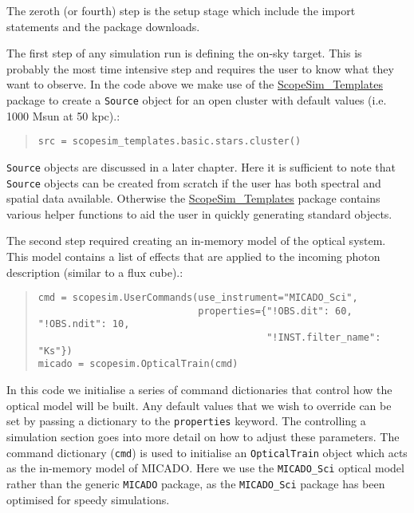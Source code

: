 The zeroth (or fourth) step is the setup stage which include the import statements and the package downloads.

The first step of any simulation run is defining the on-sky target.
This is probably the most time intensive step and requires the user to know what they want to observe.
In the code above we make use of the \href{https://scopesim-templates.readthedocs.io/en/latest/}{ScopeSim\_Templates} package to create a \texttt{Source} object for an open cluster with default values (i.e. 1000 Msun at 50 kpc).:

\begin{quote}
\begin{alltt}
\begin{lstlisting}[frame=single]
src = scopesim_templates.basic.stars.cluster()
\end{lstlisting}
\end{alltt}
\end{quote}

\texttt{Source} objects are discussed in a later chapter.
Here it is sufficient to note that \texttt{Source} objects can be created from scratch if the user has both spectral and spatial data available.
Otherwise the \href{https://scopesim-templates.readthedocs.io/en/latest/}{ScopeSim\_Templates} package contains various helper functions to aid the user in quickly generating \textquotedbl{}standard\textquotedbl{} objects.

The second step required creating an in-memory model of the optical system.
This model contains a list of effects that are applied to the incoming photon description (similar to a flux cube).:

\begin{quote}
\begin{alltt}
\begin{lstlisting}[frame=single]
cmd = scopesim.UserCommands(use_instrument="MICADO_Sci",
                            properties={"!OBS.dit": 60, "!OBS.ndit": 10,
                                        "!INST.filter_name": "Ks"})
micado = scopesim.OpticalTrain(cmd)
\end{lstlisting}
\end{alltt}
\end{quote}

In this code we initialise a series of command dictionaries that control how the optical model will be built.
Any default values that we wish to override can be set by passing a dictionary to the \texttt{properties} keyword.
The \textquotedbl{}controlling a simulation\textquotedbl{} section goes into more detail on how to adjust these parameters.
The command dictionary (\texttt{cmd}) is used to initialise an \texttt{OpticalTrain} object which acts as the in-memory model of MICADO.
Here we use the \texttt{MICADO\_Sci} optical model rather than the generic \texttt{MICADO} package, as the \texttt{MICADO\_Sci} package has been optimised for speedy simulations.

